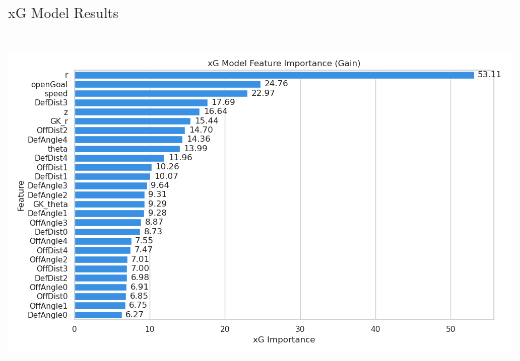 \documentclass{beamer}
\begin{document}
\begin{frame}{xG Model Results}
\begin{columns}[c]
  \includegraphics[width=\linewidth]{figures/xG_feature_importance.png}
\end{columns}
\end{frame}
\end{document}
